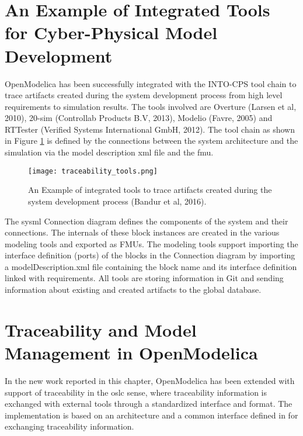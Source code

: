 \section{An Example of Integrated Tools for Cyber-Physical Model Development}
\label{sec:tracaebilitytools}

OpenModelica has been successfully integrated with the INTO-CPS tool chain to trace artifacts created
during the system development process from high level requirements to simulation results. The tools involved
are Overture (Larsen et al, 2010), 20-sim (Controllab Products B.V, 2013), Modelio (Favre, 2005) and RTTester
(Verified Systems International GmbH, 2012). The tool chain as shown in Figure \ref{fig:traceabilitytools} is defined by the
connections between the system architecture and the simulation via the model description \acrshort{xml} file and the \acrshort{fmu}.

\begin{figure}
	\texttt{[image: traceability\_tools.png]}
	\caption{An Example of integrated tools to trace artifacts created during the system development process (Bandur et al, 2016).}
	\label{fig:traceabilitytools}
\end{figure}

The \acrshort{sysml} Connection diagram defines the components of the system and their connections. The
internals of these block instances are created in the various modeling tools and exported as FMUs. 
The modeling tools support importing the interface definition (ports) of the blocks in the Connection
diagram by importing a modelDescription.xml file containing the block name and its interface definition
linked with requirements. All tools are storing information in Git and sending information about
existing and created artifacts to the global database.

\section{Traceability and Model Management in OpenModelica}
\label{sec:tracaebilityactivities}

In the new work reported in this chapter, OpenModelica has been extended with support of traceability in the \acrshort{oslc} sense, 
where traceability information is exchanged with external tools through a standardized interface and format. The implementation is based on
an architecture and a common interface defined in \cite{intocpskenneth} for exchanging traceability information. 

